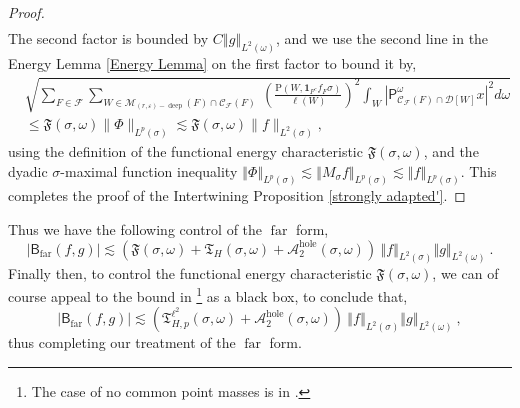 \documentclass{amsart}%
\theoremstyle{plain}
\numberwithin{equation}{section}
\begin{document}
\begin{proof}
\begin{align*}
\end{align*}
The second factor is bounded by $C\left\Vert g\right\Vert _{L^{2}\left(
\omega\right)  }$, and we use the second line in the Energy Lemma
\ref{Energy Lemma} on the first factor to bound it by,%
\begin{align}
& \sqrt{\sum_{F\in\mathcal{F}}\sum_{W\in\mathcal{M}_{\left(  r,\varepsilon
\right)  -\operatorname*{deep}}\left(  F\right)  \cap\mathcal{C}_{\mathcal{F}%
}\left(  F\right)  }\ \left(  \frac{\mathrm{P}\left(  W,\mathbf{1}_{F^{c}%
}f_{F}\sigma\right)  }{\ell\left(  W\right)  }\right)  ^{2}\int_{W}\left\vert
\mathsf{P}_{\mathcal{C}_{\mathcal{F}}\left(  F\right)  \cap\mathcal{D}\left[
W\right]  }^{\omega}x\right\vert ^{2}d\omega}\label{bound by}\\
& \leq\mathfrak{F}\left(  \sigma,\omega\right)  \lVert\Phi\rVert_{L^{p}\left(
\sigma\right)  }\lesssim\mathfrak{F}\left(  \sigma,\omega\right)  \lVert
f\rVert_{L^{2}\left(  \sigma\right)  },\nonumber
\end{align}
using the definition of the functional energy characteristic $\mathfrak{F}%
\left(  \sigma,\omega\right)  $, and the dyadic $\sigma$-maximal function
inequality $\left\Vert \Phi\right\Vert _{L^{p}\left(  \sigma\right)  }%
\lesssim\left\Vert M_{\sigma}f\right\Vert _{L^{p}\left(  \sigma\right)
}\lesssim\left\Vert f\right\Vert _{L^{p}\left(  \sigma\right)  }$. This
completes the proof of the Intertwining Proposition \ref{strongly adapted'}.
\end{proof}

Thus we have the following control of the $\operatorname{far}$ form,
\[
\left\vert \mathsf{B}_{\operatorname{far}}\left(  f,g\right)  \right\vert
\lesssim\left(  \mathfrak{F}\left(  \sigma,\omega\right)  +\mathfrak{T}%
_{H}\left(  \sigma,\omega\right)  +\mathcal{A}_{2}^{\operatorname{hole}%
}\left(  \sigma,\omega\right)  \right)  \ \left\Vert f\right\Vert
_{L^{2}\left(  \sigma\right)  }\left\Vert g\right\Vert _{L^{2}\left(
\omega\right)  }\ .
\]
Finally then, to control the functional energy characteristic $\mathfrak{F}%
\left(  \sigma,\omega\right)  $, we can of course appeal to the bound in
\cite{Hyt2}\footnote{The case of no common point masses is in \cite{LaSaShUr3}%
.} as a black box, to conclude that,%
\begin{equation}
\left\vert \mathsf{B}_{\operatorname{far}}\left(  f,g\right)  \right\vert
\lesssim\left(  \mathfrak{T}_{H,p}^{\ell^{2}}\left(  \sigma,\omega\right)
+\mathcal{A}_{2}^{\operatorname{hole}}\left(  \sigma,\omega\right)  \right)
\ \left\Vert f\right\Vert _{L^{2}\left(  \sigma\right)  }\left\Vert
g\right\Vert _{L^{2}\left(  \omega\right)  }\ ,\label{B far}%
\end{equation}
thus completing our treatment of the $\operatorname{far}$ form.
\end{document}
